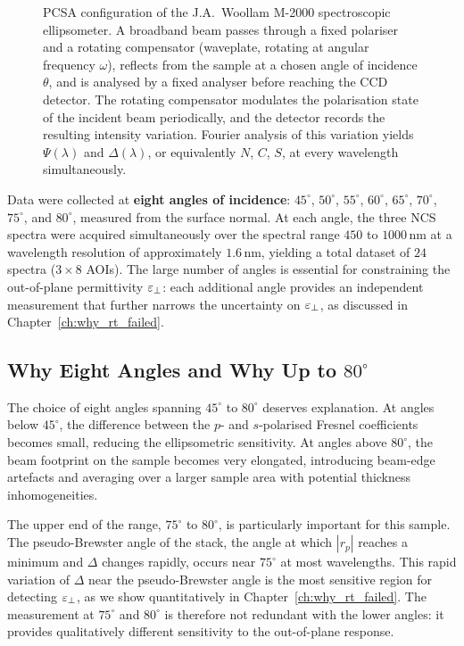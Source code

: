 \begin{figure}[h]
\caption{PCSA configuration of the J.A.\ Woollam M-2000 spectroscopic
  ellipsometer. A broadband beam passes through a fixed polariser and a
  rotating compensator (waveplate, rotating at angular frequency $\omega$),
  reflects from the sample at a chosen angle of incidence $\theta$, and is
  analysed by a fixed analyser before reaching the CCD detector. The rotating
  compensator modulates the polarisation state of the incident beam
  periodically, and the detector records the resulting intensity variation.
  Fourier analysis of this variation yields $\Psi(\lambda)$ and
  $\Delta(\lambda)$, or equivalently $N$, $C$, $S$, at every wavelength
  simultaneously.}
\label{fig:ch4_ellipsometry_setup}
\end{figure}

Data were collected at \textbf{eight angles of incidence}: $45^\circ$,
$50^\circ$, $55^\circ$, $60^\circ$, $65^\circ$, $70^\circ$, $75^\circ$,
and $80^\circ$, measured from the surface normal. At each angle, the three
NCS spectra were acquired simultaneously over the spectral range $450$ to
$1000$\,nm at a wavelength resolution of approximately $1.6$\,nm, yielding
a total dataset of $24$ spectra ($3 \times 8$ AOIs). The large number of
angles is essential for constraining the out-of-plane permittivity $\varepsilon_{\perp}$:
each additional angle provides an independent measurement that further
narrows the uncertainty on $\varepsilon_{\perp}$, as discussed in
Chapter~\ref{ch:why_rt_failed}.

\subsection{Why Eight Angles and Why Up to \texorpdfstring{$80^\circ$}{80 degrees}}

The choice of eight angles spanning $45^\circ$ to $80^\circ$ deserves
explanation. At angles below $45^\circ$, the difference between the
$p$- and $s$-polarised Fresnel coefficients becomes small, reducing the
ellipsometric sensitivity. At angles above $80^\circ$, the beam footprint
on the sample becomes very elongated, introducing beam-edge artefacts and
averaging over a larger sample area with potential thickness inhomogeneities.

The upper end of the range, $75^\circ$ to $80^\circ$, is particularly
important for this sample. The pseudo-Brewster angle of the stack, the
angle at which $|r_p|$ reaches a minimum and $\Delta$ changes rapidly,
occurs near $75^\circ$ at most wavelengths. This rapid variation of $\Delta$
near the pseudo-Brewster angle is the most sensitive region for detecting
$\varepsilon_{\perp}$, as we show quantitatively in Chapter~\ref{ch:why_rt_failed}. The
measurement at $75^\circ$ and $80^\circ$ is therefore not redundant with
the lower angles: it provides qualitatively different sensitivity to the
out-of-plane response.

